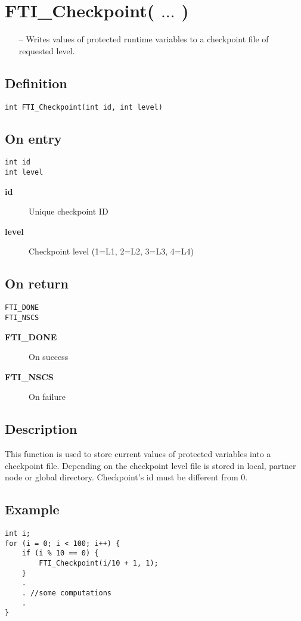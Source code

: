 \documentclass{refrep}
\begin{document}
\section{\asciifamily FTI\_Checkpoint( $\dots$ )}\label{sec:fticheckpoint}
\begin{framed}
\begin{itemize}
\item[--] Writes values of protected runtime variables to a checkpoint file of requested level.
\end{itemize}
\end{framed}
\subsection*{Definition}
\begin{lstlisting}[frame=single]
int FTI_Checkpoint(int id, int level)
\end{lstlisting}
\subsection*{On entry}
\begin{lstlisting}[frame=single]
int id
int level
\end{lstlisting}
\begin{description}
\item[\textbf{id}] Unique checkpoint ID
\item[\textbf{level}] Checkpoint level (1=L1, 2=L2, 3=L3, 4=L4)
\end{description}
\subsection*{On return}
\begin{lstlisting}[frame=single]
FTI_DONE
FTI_NSCS
\end{lstlisting}
\begin{description}
\item[\textbf{FTI\_DONE}] On success
\item[\textbf{FTI\_NSCS}] On failure
\end{description}
\subsection*{Description}
This function is used to store current values of protected variables into a checkpoint file. Depending on the checkpoint level file is stored in local, partner node or global directory. Checkpoint's id must be different from 0.
\subsection*{Example}
\begin{center}
\begin{lstlisting}[frame=single]
int i;
for (i = 0; i < 100; i++) {
    if (i % 10 == 0) {
        FTI_Checkpoint(i/10 + 1, 1);
    }
    .
    . //some computations
    .
}
\end{lstlisting}
\end{center}
\newpage
\end{document}
